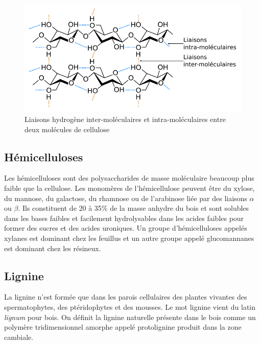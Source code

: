 
\begin{figure}[h]
\centering
\includegraphics[scale=0.8]{img/ch6_cellulose_hydrogene}
\caption{Liaisons hydrogène inter-moléculaires et intra-moléculaires entre deux molécules de cellulose}
\label{fig:cellulose_hydrogene}
\end{figure}

\subsection{Hémicelluloses}

Les hémicelluloses sont des polysaccharides de masse moléculaire beaucoup plus faible que la cellulose. Les monomères de l'hémicellulose peuvent être du xylose, du mannose, du galactose, du rhamnose ou de l'arabinose liée par des liaisons $\alpha$ ou $\beta$. Ils constituent de 20 à 35\% de la masse anhydre du bois et sont solubles dans les bases faibles et facilement hydrolysables dans les acides faibles pour former des sucres et des acides uroniques. Un groupe d'hémicelluloses appelés xylanes est dominant chez les feuillus et un autre groupe appelé glucomannanes est dominant chez les résineux.

\subsection{Lignine}

La lignine n'est formée que dans les parois cellulaires des plantes vivantes des spermatophytes, des ptéridophytes et des mousses. Le mot lignine vient du latin \textit{lignum} pour bois. On définit la lignine naturelle présente dans le bois comme un polymère tridimensionnel amorphe appelé protolignine produit dans la zone cambiale.\\

